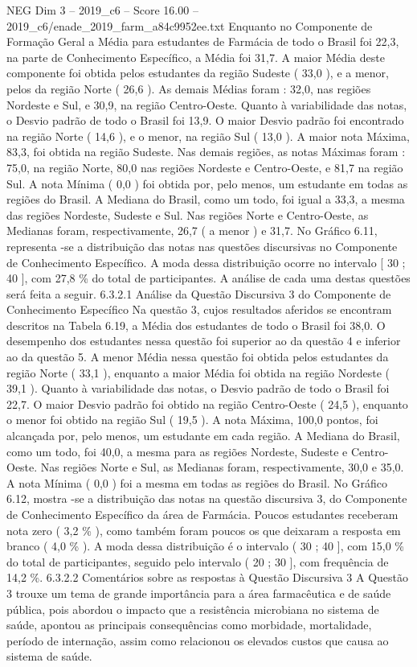 \begin{textsample}{NEG Dim 3 – 2019\_c6 – Score 16.00 – 2019\_c6/enade\_2019\_farm\_a84c9952ee.txt}
Enquanto no Componente de Formação Geral a Média para estudantes de Farmácia de todo o Brasil foi 22,3, na parte de Conhecimento Específico, a Média foi 31,7.
A maior Média deste componente foi obtida pelos estudantes da região Sudeste ( 33,0 ), e a menor, pelos da região Norte ( 26,6 ).
As demais Médias foram : 32,0, nas regiões Nordeste e Sul, e 30,9, na região Centro-Oeste.
Quanto à variabilidade das notas, o Desvio padrão de todo o Brasil foi 13,9.
O maior Desvio padrão foi encontrado na região Norte ( 14,6 ), e o menor, na região Sul ( 13,0 ).
A maior nota Máxima, 83,3, foi obtida na região Sudeste.
Nas demais regiões, as notas Máximas foram : 75,0, na região Norte, 80,0 nas regiões Nordeste e Centro-Oeste, e 81,7 na região Sul.
A nota Mínima ( 0,0 ) foi obtida por, pelo menos, um estudante em todas as regiões do Brasil.
A Mediana do Brasil, como um todo, foi igual a 33,3, a mesma das regiões Nordeste, Sudeste e Sul.
Nas regiões Norte e Centro-Oeste, as Medianas foram, respectivamente, 26,7 ( a menor ) e 31,7.
No Gráfico 6.11, representa -se a distribuição das notas nas questões discursivas no Componente de Conhecimento Específico.
A moda dessa distribuição ocorre no intervalo [ 30 ; 40 ], com 27,8 \% do total de participantes.
A análise de cada uma destas questões será feita a seguir. 6.3.2.1 Análise da Questão Discursiva 3 do Componente de Conhecimento Específico Na questão 3, cujos resultados aferidos se encontram descritos na Tabela 6.19, a Média dos estudantes de todo o Brasil foi 38,0.
O desempenho dos estudantes nessa questão foi superior ao da questão 4 e inferior ao da questão 5.
A menor Média nessa questão foi obtida pelos estudantes da região Norte ( 33,1 ), enquanto a maior Média foi obtida na região Nordeste ( 39,1 ).
Quanto à variabilidade das notas, o Desvio padrão de todo o Brasil foi 22,7.
O maior Desvio padrão foi obtido na região Centro-Oeste ( 24,5 ), enquanto o menor foi obtido na região Sul ( 19,5 ).
A nota Máxima, 100,0 pontos, foi alcançada por, pelo menos, um estudante em cada região.
A Mediana do Brasil, como um todo, foi 40,0, a mesma para as regiões Nordeste, Sudeste e Centro-Oeste.
Nas regiões Norte e Sul, as Medianas foram, respectivamente, 30,0 e 35,0.
A nota Mínima ( 0,0 ) foi a mesma em todas as regiões do Brasil.
No Gráfico 6.12, mostra -se a distribuição das notas na questão discursiva 3, do Componente de Conhecimento Específico da área de Farmácia.
Poucos estudantes receberam nota zero ( 3,2 \% ), como também foram poucos os que deixaram a resposta em branco ( 4,0 \% ).
A moda dessa distribuição é o intervalo ( 30 ; 40 ], com 15,0 \% do total de participantes, seguido pelo intervalo ( 20 ; 30 ], com frequência de 14,2 \%. 6.3.2.2 Comentários sobre as respostas à Questão Discursiva 3 A Questão 3 trouxe um tema de grande importância para a área farmacêutica e de saúde pública, pois abordou o impacto que a resistência microbiana no sistema de saúde, apontou as principais consequências como morbidade, mortalidade, período de internação, assim como relacionou os elevados custos que causa ao sistema de saúde.

\end{textsample}
